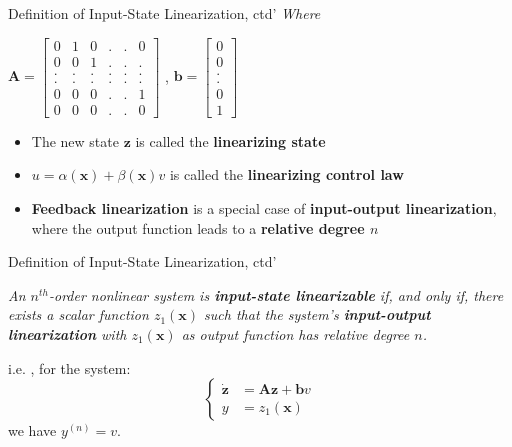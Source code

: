 \documentclass{beamer}
\renewcommand{\vec}[1]{\ensuremath{\boldsymbol{#1}}} %
\begin{document}
\begin{frame}{Definition of Input-State Linearization, ctd'}
    \textit{Where}
    \begin{center}
    $\vec{A}=\left[\begin{matrix}
                    0 & 1 & 0 & . & . & 0 \\
                    0 & 0 & 1 & . & . & . \\
                    . & . & . & . & . & . \\
                    . & . & . & . & . & . \\
                    0 & 0 & 0 & . & . & 1 \\
                    0 & 0 & 0 & . & . & 0
                  \end{matrix}\right]$ , \quad
    $\vec{b}=\left[\begin{matrix}
                       0 \\
                       0 \\
                       . \\
                       . \\
                       0 \\
                       1
                     \end{matrix}\right]$
    \end{center}
    \begin{itemize}
      \item The new state \vec{z} is called the \textbf{linearizing state}
      \item $u = \alpha(\vec{x})+\beta(\vec{x})v$ is called the \textbf{linearizing control law}
      \item \textbf{Feedback linearization} is a {\color{red}special case} of \textbf{input-output linearization}, where the output function leads to a \textbf{relative degree $n$}
    \end{itemize}
\end{frame}


\begin{frame}{Definition of Input-State Linearization, ctd'}
    \begin{lemma}[6.3]
    \textit{
    An $n^{th}$-order nonlinear system is \textbf{input-state linearizable} if, and only if, there exists a scalar function $z_{1}(\vec{x})$ such that the system's \textbf{input-output linearization} with $z_{1}(\vec{x})$ as output function has relative degree $n$.}
    \end{lemma}

    i.e. , for the system:
    \begin{equation}\label{relation-equation}\nonumber
      \left\{\begin{aligned}
               \dot{\vec{z}} &= \vec{A}\vec{z}+\vec{b}v \\
               y &= z_{1}(\vec{x})
             \end{aligned}\right.
    \end{equation}
    we have {\color{red}$y^{(n)} = v$}.
\end{frame}
\end{document}

